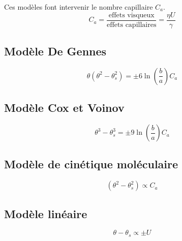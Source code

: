\documentclass[french]{article}
\begin{document}
Ces modèles font intervenir le nombre capillaire $C_{a}$.
\begin{equation}
	C_{a} 
	= \frac{\text{effets visqueux}}{\text{effets capillaires}} 
	= \frac{\eta U}{\gamma}
\end{equation}
\subsection*{Modèle De Gennes} 

\begin{equation}
	\label{modele:gennes}
	\theta 
	\left(\theta^{2} - \theta_{s}^{2}\right) 
	= \pm 6\ln\left(\frac{b}{a}\right)C_{a}
\end{equation}
\subsection*{Modèle Cox et Voinov}  

\begin{equation}
	\label{modele:Cox}
	\theta^{3} - \theta_{s}^{3} = 
	\pm 
	9\ln\left(
	\frac{b}{a}\right) C_{a}
\end{equation}
\subsection*{Modèle de cinétique moléculaire}  

\begin{equation}
	\left(\theta^{2} - \theta_{s}^{2}\right) 
	\propto C_{a}
\end{equation}
\subsection*{Modèle linéaire} 

\begin{equation}
	\theta - \theta_{s} \propto \pm U
\end{equation}
\end{document}
